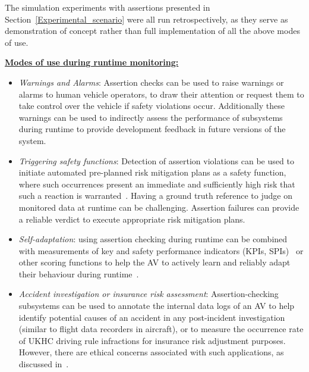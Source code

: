 	The simulation experiments with assertions presented in Section~\ref{Experimental_scenario} were all run retrospectively, as they serve as demonstration of concept rather than full implementation of all the above modes of use. %


\underline{\textbf{Modes of use during runtime monitoring:}}
	
	\begin{itemize}
		\item \emph{Warnings and Alarms}: Assertion checks can be used to raise warnings or alarms to human vehicle operators, to draw their attention or request them to take control over the vehicle if safety violations occur. Additionally these warnings can be used to indirectly assess the performance of subsystems during runtime to provide development feedback in future versions of the system.
		
		\item \emph{Triggering safety functions}: Detection of assertion violations can be used to initiate automated pre-planned risk mitigation plans as a safety function, where such occurrences present an immediate and sufficiently high risk that such a reaction is warranted~\cite{RuntimeReview}. Having a ground truth reference to judge on monitored data at runtime can be challenging. Assertion failures can provide a reliable verdict to execute appropriate risk mitigation plans.
		
		\item \emph{Self-adaptation}: using assertion checking during runtime can be combined with measurements of key and safety performance indicators (KPIs, SPIs)~\cite{Koopman2020} or other scoring functions to help the AV %
		to actively learn and reliably adapt their behaviour during runtime~\cite{Kang2020}.
		
		\item \emph{Accident investigation or insurance risk assessment}: Assertion-checking subsystems can be used to annotate the internal data logs of an AV to help identify potential causes of an accident in any post-incident investigation (similar to flight data recorders in aircraft), or to measure the occurrence rate of UKHC driving rule infractions for insurance risk adjustment purposes. However, there are ethical concerns associated with such applications, as discussed in~\cite{EthicalBlackBox}.
		
	\end{itemize}


